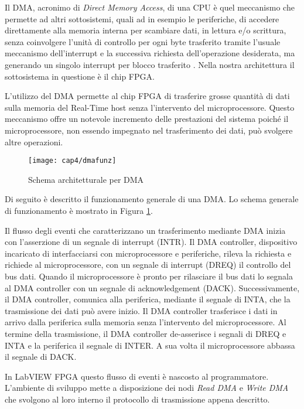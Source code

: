 Il DMA, acronimo di \textit{Direct Memory Access}, di una CPU è quel meccanismo che permette ad altri sottosistemi, quali ad in esempio le periferiche, di accedere direttamente alla memoria interna per scambiare dati, in lettura e/o scrittura, senza coinvolgere l'unità di controllo per ogni byte trasferito tramite l'usuale meccanismo dell'interrupt e la successiva richiesta dell'operazione desiderata, ma generando un singolo interrupt per blocco trasferito \cite{tanembaum}. Nella nostra architettura il sottosistema in questione è il chip FPGA.

L'utilizzo del DMA permette al chip FPGA di trasferire grosse quantità di dati sulla memoria del Real-Time host senza l'intervento del microprocessore. Questo meccanismo offre un notevole incremento delle prestazioni del sistema poiché il microprocessore, non essendo impegnato nel trasferimento dei dati, può svolgere altre operazioni.
\begin{figure}[H] 
  \begin{center}
    \texttt{[image: cap4/dmafunz]}
    \caption{Schema architetturale per DMA}
    \label{dmafunz}
  \end{center}
\end{figure} 

Di seguito è descritto il funzionamento generale di una DMA. Lo schema generale di funzionamento è mostrato in Figura \ref{dmafunz}.

Il flusso degli eventi che caratterizzano un trasferimento mediante DMA inizia con l'asserzione di un segnale di interrupt (INTR). Il DMA controller, dispositivo incaricato di interfacciarsi con microprocessore e periferiche, rileva la richiesta e richiede al microprocessore, con un segnale di interrupt (DREQ) il controllo del bus dati. Quando il microprocessore è pronto per rilasciare il bus dati lo segnala al DMA controller con un segnale di acknowledgement (DACK). Successivamente, il DMA controller, comunica alla periferica, mediante il segnale di INTA, che la trasmissione dei dati può avere inizio. Il DMA controller trasferisce i dati in arrivo dalla periferica sulla memoria senza l'intervento del microprocessore. Al termine della trasmissione, il DMA controller de-asserisce i segnali di DREQ e INTA e la periferica il segnale di INTER. A sua volta il microprocessore abbassa il segnale di DACK.

In LabVIEW FPGA questo flusso di eventi è nascosto al programmatore. L'ambiente di sviluppo mette a disposizione dei nodi \textit{Read DMA} e \textit{Write DMA} che svolgono al loro interno il protocollo di trasmissione appena descritto.


